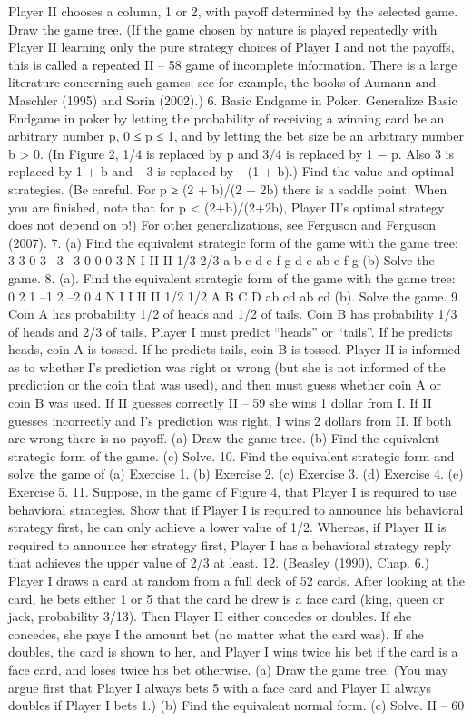 Player II chooses a column, 1 or 2, with payoff determined by the selected game. Draw
the game tree. (If the game chosen by nature is played repeatedly with Player II learning
only the pure strategy choices of Player I and not the payoffs, this is called a repeated
II – 58
game of incomplete information. There is a large literature concerning such games; see for
example, the books of Aumann and Maschler (1995) and Sorin (2002).)
6. Basic Endgame in Poker. Generalize Basic Endgame in poker by letting the
probability of receiving a winning card be an arbitrary number p, 0 ≤ p ≤ 1, and by letting
the bet size be an arbitrary number b > 0. (In Figure 2, 1/4 is replaced by p and 3/4 is
replaced by 1 − p. Also 3 is replaced by 1 + b and −3 is replaced by −(1 + b).) Find the
value and optimal strategies. (Be careful. For p ≥ (2 + b)/(2 + 2b) there is a saddle point.
When you are finished, note that for p < (2+b)/(2+2b), Player II’s optimal strategy does
not depend on p!) For other generalizations, see Ferguson and Ferguson (2007).
7. (a) Find the equivalent strategic form of the game with the game tree:
3
3 0 3 –3 –3 0 0 0 3
N
I II
II
1/3 2/3
a b c d e
f g d e ab c f g
(b) Solve the game.
8. (a). Find the equivalent strategic form of the game with the game tree:
0 2 1 –1 2 –2 0 4
N
I I
II II
1/2 1/2
A B C D
ab cd ab cd
(b). Solve the game.
9. Coin A has probability 1/2 of heads and 1/2 of tails. Coin B has probability 1/3 of
heads and 2/3 of tails. Player I must predict “heads” or “tails”. If he predicts heads, coin
A is tossed. If he predicts tails, coin B is tossed. Player II is informed as to whether I’s
prediction was right or wrong (but she is not informed of the prediction or the coin that
was used), and then must guess whether coin A or coin B was used. If II guesses correctly
II – 59
she wins 1 dollar from I. If II guesses incorrectly and I’s prediction was right, I wins 2
dollars from II. If both are wrong there is no payoff.
(a) Draw the game tree.
(b) Find the equivalent strategic form of the game.
(c) Solve.
10. Find the equivalent strategic form and solve the game of
(a) Exercise 1.
(b) Exercise 2.
(c) Exercise 3.
(d) Exercise 4.
(e) Exercise 5.
11. Suppose, in the game of Figure 4, that Player I is required to use behavioral
strategies. Show that if Player I is required to announce his behavioral strategy first, he
can only achieve a lower value of 1/2. Whereas, if Player II is required to announce her
strategy first, Player I has a behavioral strategy reply that achieves the upper value of 2/3
at least.
12. (Beasley (1990), Chap. 6.) Player I draws a card at random from a full deck of
52 cards. After looking at the card, he bets either 1 or 5 that the card he drew is a face
card (king, queen or jack, probability 3/13). Then Player II either concedes or doubles. If
she concedes, she pays I the amount bet (no matter what the card was). If she doubles,
the card is shown to her, and Player I wins twice his bet if the card is a face card, and
loses twice his bet otherwise.
(a) Draw the game tree. (You may argue first that Player I always bets 5 with a face card
and Player II always doubles if Player I bets 1.)
(b) Find the equivalent normal form.
(c) Solve.
II – 60

